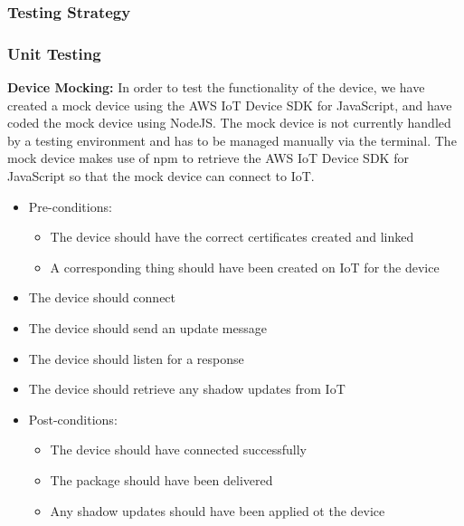 \documentclass{article}
\begin{document}
		\subsubsection{Testing Strategy}
			\subsubsection{Unit Testing}
				\textbf{Device Mocking:}
				In order to test the functionality of the device, we have created a mock device using the AWS IoT Device SDK for JavaScript, and have coded the mock device using NodeJS. The mock device is not currently handled by a testing environment and has to be managed manually via the terminal. The mock device makes use of npm to retrieve the AWS IoT Device SDK for JavaScript so that the mock device can connect to IoT.
				\begin{itemize}
					\item Pre-conditions:
						\begin{itemize}
							\item The device should have the correct certificates created and linked
							\item A corresponding thing should have been created on IoT for the device
						\end{itemize}
					\item The device should connect
					\item The device should send an update message
					\item The device should listen for a response
					\item The device should retrieve any shadow updates from IoT
					\item Post-conditions:
						\begin{itemize}
							\item The device should have connected successfully
							\item The package should have been delivered 
							\item Any shadow updates should have been applied ot the device
						\end{itemize}
				\end{itemize}
				
\end{document}
